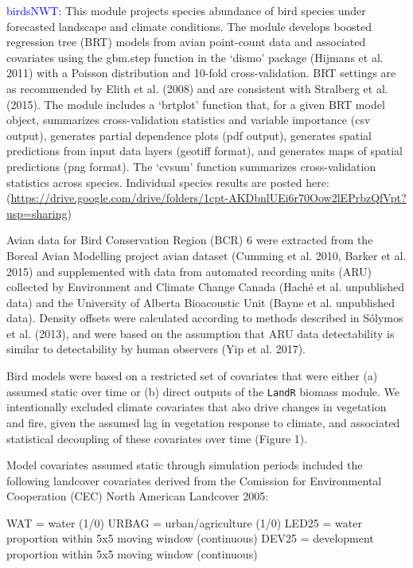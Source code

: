 \documentclass[]{article}
\begin{document}
\textcolor{blue}{birdsNWT}: This module projects species abundance of
bird species under forecasted landscape and climate conditions. The
module develops boosted regression tree (BRT) models from avian
point-count data and associated covariates using the gbm.step function
in the `dismo' package (Hijmans et al. 2011) with a Poisson distribution
and 10-fold cross-validation. BRT settings are as recommended by Elith
et al. (2008) and are consistent with Stralberg et al. (2015). The
module includes a `brtplot' function that, for a given BRT model object,
summarizes cross-validation statistics and variable importance (csv
output), generates partial dependence plots (pdf output), generates
spatial predictions from input data layers (geotiff format), and
generates maps of spatial predictions (png format). The `cvsum' function
summarizes cross-validation statistics across species. Individual
species results are posted here:
(\url{https://drive.google.com/drive/folders/1cpt-AKDbnlUEi6r70Oow2lEPrbzQfVpt?usp=sharing})

Avian data for Bird Conservation Region (BCR) 6 were extracted from the
Boreal Avian Modelling project avian dataset (Cumming et al. 2010,
Barker et al. 2015) and supplemented with data from automated recording
units (ARU) collected by Environment and Climate Change Canada (Haché et
al. unpublished data) and the University of Alberta Bioacoustic Unit
(Bayne et al. unpublished data). Density offsets were calculated
according to methods described in Sólymos et al. (2013), and were based
on the assumption that ARU data detectability is similar to
detectability by human observers (Yip et al. 2017).

Bird models were based on a restricted set of covariates that were
either (a) assumed static over time or (b) direct outputs of the
\texttt{LandR} biomass module. We intentionally excluded climate
covariates that also drive changes in vegetation and fire, given the
assumed lag in vegetation response to climate, and associated
statistical decoupling of these covariates over time (Figure 1).

Model covariates assumed static through simulation periods included the
following landcover covariates derived from the Comission for
Environmental Cooperation (CEC) North American Landcover 2005:

WAT = water (1/0) URBAG = urban/agriculture (1/0) LED25 = water
proportion within 5x5 moving window (continuous) DEV25 = development
proportion within 5x5 moving window (continuous)
\end{document}
